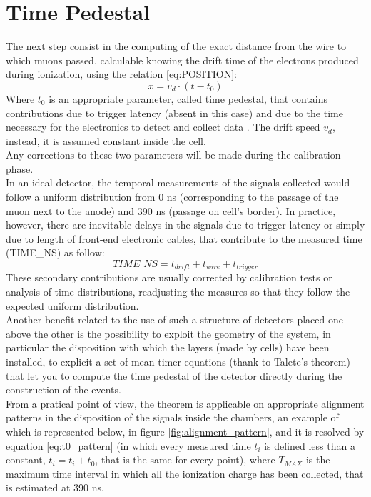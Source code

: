 \documentclass[a4paper,11pt]{book}
\begin{document}
\section{Time Pedestal}

The next step consist in the computing of the exact distance from the wire to which muons passed, calculable knowing the drift time of the electrons produced during ionization, using the relation \ref{eq:POSITION}:
\begin{equation}
x = v_d\cdot(t-t_0)
\label{eq:POSITION}
\end{equation}
Where $t_0$ is an appropriate parameter, called time pedestal, that contains contributions due to trigger latency (absent in this case) and due to the time necessary for the electronics to detect and collect data \cite{bib:CMS}. The drift speed $v_d$, instead, it is assumed constant inside the cell.\\
Any corrections to these two parameters will be made during the calibration phase.\\
In an ideal detector, the temporal measurements of the signals collected would follow a uniform distribution from 0 ns (corresponding to the passage of the muon next to the anode) and 390 ns (passage on cell's border). In practice, however, there are inevitable delays in the signals due to trigger latency or simply due to length of front-end electronic cables, that contribute to the measured time (TIME\_NS)  as follow:
\[ TIME\_NS = t_{drift} + t_{wire} + t_{trigger} \]
These secondary contributions are usually corrected by calibration tests or analysis of time distributions, readjusting the measures so that they follow the expected uniform distribution.\\
Another benefit related to the use of such a structure of detectors placed one above the other is the possibility to exploit the geometry of the system, in particular the disposition with which the layers (made by cells) have been installed, to explicit a set of mean timer equations (thank to Talete's theorem) that let you to compute the time pedestal of the detector directly during the construction of the events.\\
From a pratical point of view, the theorem is applicable on appropriate alignment patterns in the disposition of the signals inside the chambers, an example of which is represented below, in figure \ref{fig:alignment_pattern}, and it is resolved by equation \ref{eq:t0_pattern} (in which every measured time $t_i$ is defined less than a constant, $t_i = t_i + t_0$, that is the same for every point), where $T_{MAX}$ is the maximum time interval in which all the ionization charge has been collected, that is estimated at 390 ns.
\end{document}
